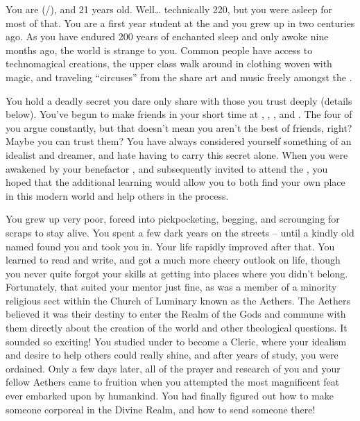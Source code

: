 \documentclass[char]{GL2020}
\begin{document}
\name{\cDisney{}}


You are \cDisney{\full} (\cDisney{\they}/\cDisney{\them}), and 21 years old. Well\ldots{} technically 220, but you were asleep for most of that. You are a first year student at the \pSchool{} and you grew up in \pFarm{} two centuries ago. As you have endured 200 years of enchanted sleep and only awoke nine months ago, the world is strange to you. Common people have access to technomagical creations, the upper class walk around in clothing woven with magic, and traveling ``circuses'' from the \pTech{} share art and music freely amongst the \pFarmers{}.

You hold a deadly secret you dare only share with those you trust deeply (details below). You've begun to make friends in your short time at \pSchool{}, \cPirateChild{\full}, \cTechStar{\full}, and \cAdopted{\full}. The four of you argue constantly, but that doesn't mean you aren't the best of friends, right? Maybe you can trust them? You have always considered yourself something of an idealist and dreamer, and hate having to carry this secret alone. When you were awakened by your benefactor \cWildCard{\full}, and subsequently invited to attend the \pSchool{}, you hoped that the additional learning would allow you to both find your own place in this modern world and help others in the process.

You grew up very poor, forced into pickpocketing, begging, and scrounging for scraps to stay alive. You spent a few dark years on the streets -- until a kindly old \cDisneyMentor{\cleric} named \cDisneyMentor{} found you and took you in. Your life rapidly improved after that. You learned to read and write, and got a much more cheery outlook on life, though you never quite forgot your skills at getting into places where you didn't belong. Fortunately, that suited your mentor just fine, as \cDisneyMentor{\they} was a member of a minority religious sect within the Church of Luminary known as the Aethers. The Aethers believed it was their destiny to enter the Realm of the Gods and commune with them directly about the creation of the world and other theological questions. It sounded so exciting! You studied under \cDisneyMentor{} to become a Cleric, where your idealism and desire to help others could really shine, and after years of study, you were ordained. Only a few days later, all of the prayer and research of you and your fellow Aethers came to fruition when you attempted the most magnificent feat ever embarked upon by humankind. You had finally figured out how to make someone corporeal in the Divine Realm, and how to send someone there!
\end{document}
